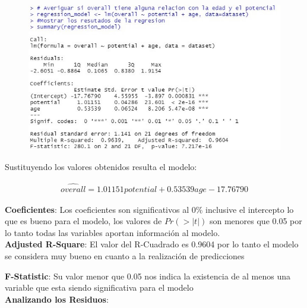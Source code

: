 \documentclass[a4paper,10pt,twocolumn]{article}
\begin{document}
\begin{figure}[h]
	\includegraphics[scale=0.65]{./imgs/reg_model.jpg}
\end{figure}

Sustituyendo los valores obtenidos resulta el modelo:

\begin{align*}
\widehat{overall} = 1.01151 potential + 0.53539 age - 17.76790
\end{align*}

\textbf{Coeficientes}: Los coeficientes son significativos al $0\%$ inclusive el intercepto lo que es bueno para el modelo, los valores de $Pr(>|t|)$ son menores que 0.05 por lo tanto todas las variables aportan información al modelo.\\

\textbf{Adjusted R-Square}: El valor del R-Cuadrado es 0.9604 por lo tanto el modelo se considera muy bueno en cuanto a la realizaci\'on de predicciones

\textbf{F-Statistic}: Su valor menor que 0.05 nos indica la existencia de al menos una variable que esta siendo significativa para el modelo\\


\textbf{Analizando los Residuos}:
\end{document}
